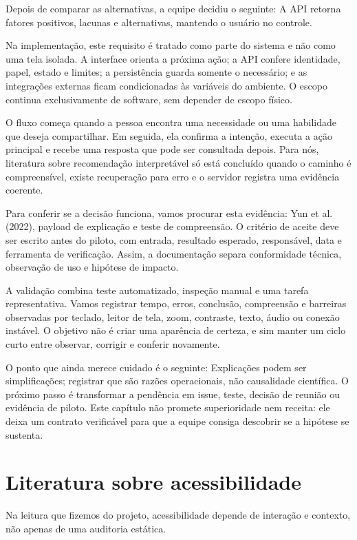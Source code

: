\documentclass[12pt,oneside,a4paper,article]{abntex2}
\begin{document}
Depois de comparar as alternativas, a equipe decidiu o seguinte: A API retorna fatores positivos, lacunas e alternativas, mantendo o usuário no controle.

Na implementação, este requisito é tratado como parte do sistema e não como uma tela isolada. A interface orienta a próxima ação; a API confere identidade, papel, estado e limites; a persistência guarda somente o necessário; e as integrações externas ficam condicionadas às variáveis do ambiente. O escopo continua exclusivamente de software, sem depender de escopo físico.

O fluxo começa quando a pessoa encontra uma necessidade ou uma habilidade que deseja compartilhar. Em seguida, ela confirma a intenção, executa a ação principal e recebe uma resposta que pode ser consultada depois. Para nós, literatura sobre recomendação interpretável só está concluído quando o caminho é compreensível, existe recuperação para erro e o servidor registra uma evidência coerente.

Para conferir se a decisão funciona, vamos procurar esta evidência: Yun et al. (2022), payload de explicação e teste de compreensão. O critério de aceite deve ser escrito antes do piloto, com entrada, resultado esperado, responsável, data e ferramenta de verificação. Assim, a documentação separa conformidade técnica, observação de uso e hipótese de impacto.

A validação combina teste automatizado, inspeção manual e uma tarefa representativa. Vamos registrar tempo, erros, conclusão, compreensão e barreiras observadas por teclado, leitor de tela, zoom, contraste, texto, áudio ou conexão instável. O objetivo não é criar uma aparência de certeza, e sim manter um ciclo curto entre observar, corrigir e conferir novamente.

O ponto que ainda merece cuidado é o seguinte: Explicações podem ser simplificações; registrar que são razões operacionais, não causalidade científica. O próximo passo é transformar a pendência em issue, teste, decisão de reunião ou evidência de piloto. Este capítulo não promete superioridade nem receita: ele deixa um contrato verificável para que a equipe consiga descobrir se a hipótese se sustenta.

\section{Literatura sobre acessibilidade}
Na leitura que fizemos do projeto, acessibilidade depende de interação e contexto, não apenas de uma auditoria estática.
\end{document}

